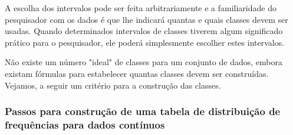 \documentclass[11pt,fleqn]{book} %
\begin{document}
A escolha dos intervalos pode ser feita arbitrariamente e a familiaridade do pesquisador com os dados é que lhe indicará quantas e quais classes devem ser usadas. Quando determinados intervalos de classes tiverem algum significado prático para o pesquisador, ele poderá simplesmente escolher estes intervalos. 

Não existe um número "ideal" de classes para um conjunto de dados, embora existam fórmulas para estabelecer quantas classes devem ser construídas. Vejamos, a seguir um critério para a construção das classes. \\


\subsubsection*{Passos para construção de uma tabela de distribuição de frequências para dados contínuos}
\end{document}
